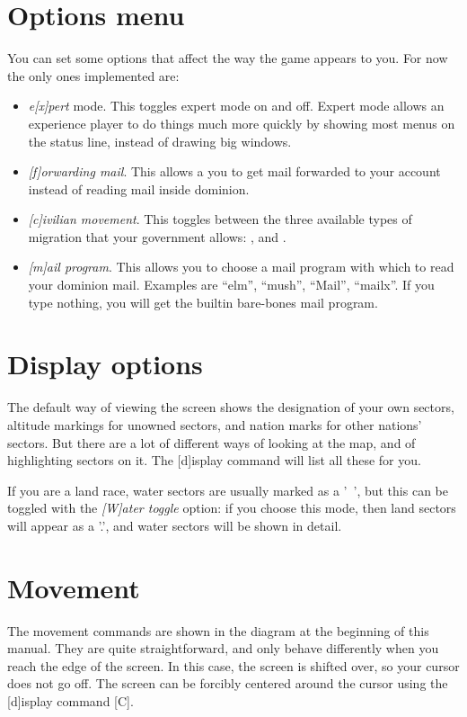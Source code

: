 \section{Options menu}
You can set some options that affect the way the game appears to you.
For now the only ones implemented are:
\begin{itemize}
\item
\emph{e[x]pert} mode.  This toggles expert mode on and off.  Expert mode
allows an experience player to do things much more quickly by showing
most menus on the status line, instead of drawing big windows.
\item
\emph{[f]orwarding mail}.  This allows a you to get mail forwarded
to your account instead of reading mail inside dominion.
\item
\emph{[c]ivilian movement}.  This toggles between the three available
types of migration that your government allows: ,
 and .
\item
\emph{[m]ail program}.  This allows you to choose a mail program with
which to read your dominion mail.  Examples are ``elm'', ``mush'', ``Mail'',
``mailx''.  If you type nothing, you will get the builtin bare-bones mail
program.
\end{itemize}

\section{Display options}
The default way of viewing the screen shows the designation of your
own sectors, altitude markings for unowned sectors, and nation marks
for other nations' sectors.  But there are a lot of different ways of
looking at the map, and of highlighting sectors on it.  The [d]isplay
command will list all these for you.

If you are a land race, water sectors are usually marked as a '~', but
this can be toggled with the \emph{[W]ater toggle} option: if you
choose this mode, then land sectors will appear as a '.', and water
sectors will be shown in detail.

\section{Movement}
The movement commands are shown in the diagram at the beginning of this
manual.  They are quite straightforward, and only behave differently
when you reach the edge of the screen.  In this case, the screen is
shifted over, so your cursor does not go off.  The screen can be
forcibly centered around the cursor using the [d]isplay command [C].

